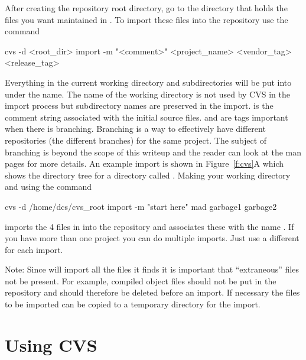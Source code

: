 After creating the repository root directory, go to the directory that
holds the files you want maintained in \cvs. To import these files
into the \cvs repository use the command
\begin{example}
  cvs -d <root_dir> import -m "<comment>" <project_name> <vendor_tag> <release_tag>
\end{example}
Everything in the current working directory and subdirectories will be
put into \cvs under the  name. The name of the
working directory is not used by CVS in the import process but
subdirectory names are preserved in the import.  is the
comment string associated with the initial source
files.  and  are tags important
when there is branching. Branching is a way to effectively have
different repositories (the different branches) for the same
project. The subject of branching is beyond the scope of this writeup
and the reader can look at the \cvs man pages for more details.  An
example import is shown in Figure~\ref{f:cvs}A which shows the
directory tree for a directory called .  Making
 your working directory and using the command
\begin{example}
    cvs -d /home/dcs/cvs_root import -m "start here" mad garbage1 garbage2
\end{example}
imports the 4 files in  into the repository and
associates these with the name . If you have more than one
project you can do multiple imports. Just use a different
 for each import. 

Note: Since \cvs will import all the files it finds it is important
that ``extraneous'' files not be present. For example, compiled object
files should not be put in the repository and should therefore be
deleted before an import. If necessary the files to be imported can be
copied to a temporary directory for the import.

\section{Using CVS}
\label{s:cvs_use}


